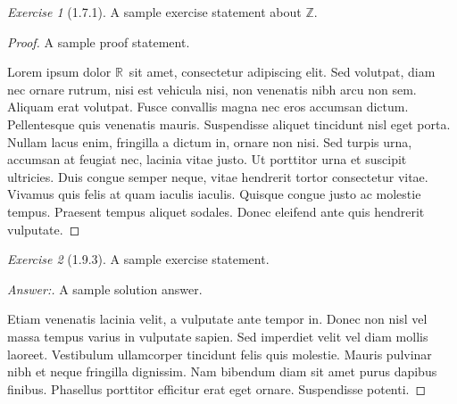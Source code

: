 \documentclass[12pt]{amsart}
\theoremstyle{remark}
\newtheorem*{exercise}{Exercise}%
\newcommand{\RR}{\ensuremath{\mathbb R}} %
\newcommand{\ZZ}{\ensuremath{\mathbb Z}}
\theoremstyle{mycomment}
\begin{document}
\thispagestyle{fancy}

\begin{exercise}[1.7.1] A sample exercise statement about \ZZ. 
\begin{proof} A sample proof statement. 

Lorem ipsum dolor \RR\ sit amet, consectetur adipiscing elit. Sed volutpat, diam nec ornare rutrum, nisi est vehicula nisi, non venenatis nibh arcu non sem. Aliquam erat volutpat. Fusce convallis magna nec eros accumsan dictum. Pellentesque quis venenatis mauris. Suspendisse aliquet tincidunt nisl eget porta. Nullam lacus enim, fringilla a dictum in, ornare non nisi. Sed turpis urna, accumsan at feugiat nec, lacinia vitae justo. Ut porttitor urna et suscipit ultricies. Duis congue semper neque, vitae hendrerit tortor consectetur vitae. Vivamus quis felis at quam iaculis iaculis. Quisque congue justo ac molestie tempus. Praesent tempus aliquet sodales. Donec eleifend ante quis hendrerit vulputate.
\end{proof}
\end{exercise}

\begin{exercise}[1.9.3] A sample exercise statement.
\begin{proof}[Answer:]  A sample solution answer.

Etiam venenatis lacinia velit, a vulputate ante tempor in. Donec non nisl vel massa tempus varius in vulputate sapien. Sed imperdiet velit vel diam mollis laoreet. Vestibulum ullamcorper tincidunt felis quis molestie. Mauris pulvinar nibh et neque fringilla dignissim. Nam bibendum diam sit amet purus dapibus finibus. Phasellus porttitor efficitur erat eget ornare. Suspendisse potenti.
\end{proof}
\end{exercise}


 
\end{document}
